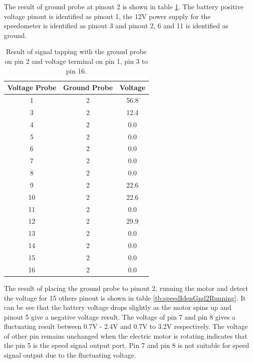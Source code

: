 The result of ground probe at pinout 2 is shown in table \ref{tb:speedIdenGnd2}. The battery positive voltage pinout is identified as pinout 1, the 12V power supply for the speedometer is identified as pinout 3 and pinout 2, 6 and 11 is identified as ground. 

\begin{table}[htbp]
\begin{center}
\begin{tabular}{|c|c|c|}
\hline
\textbf{Voltage Probe} & \textbf{Ground Probe} & \textbf{Voltage} \\ \hline
1 & 2 & 56.8 \\ \hline
3 & 2 & 12.4 \\ \hline
4 & 2 & 0.0 \\ \hline
5 & 2 & 0.0 \\ \hline
6 & 2 & 0.0 \\ \hline
7 & 2 & 0.0 \\ \hline
8 & 2 & 0.0 \\ \hline
9 & 2 & 22.6 \\ \hline
10 & 2 & 22.6 \\ \hline
11 & 2 & 0.0 \\ \hline
12 & 2 & 29.9 \\ \hline
13 & 2 & 0.0 \\ \hline
14 & 2 & 0.0 \\ \hline
15 & 2 & 0.0 \\ \hline
16 & 2 & 0.0 \\ \hline
\end{tabular}
\end{center}
\caption{Result of signal tapping with the ground probe on pin 2 and voltage terminal on pin 1, pin 3 to pin 16.}
\label{tb:speedIdenGnd2}
\end{table}

The result of placing the ground probe to pinout 2, running the motor and detect the voltage for 15 others pinout is shown in table \ref{tb:speedIdenGnd2Running}. It can be see that the battery voltage drops slightly as the motor spins up and pinout 5 give a negative voltage result. The voltage of pin 7 and pin 8 gives a fluctuating result between 0.7V - 2.4V and 0.7V to 3.2V respectively. The voltage of other pin remains unchanged when the electric motor is rotating indicates that the pin 5 is the speed signal output port. Pin 7 and pin 8 is not suitable for speed signal output due to the fluctuating voltage.

